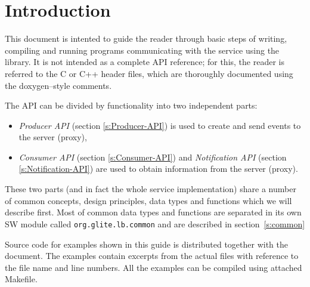 %
%

\section{Introduction}

This document is intented to guide the reader through basic steps
of writing, compiling and running programs communicating with the \LB
service using the \LB library. It is not intended as a complete API
reference; for this, the reader is referred to the C or C++ header
files, which are thoroughly documented using the doxygen--style
comments.

The \LB API can be divided by functionality into two independent
parts:
\begin{itemize}
\item \textit{\LB Producer API} (section \ref{s:Producer-API}) is used
to create and send events to the \LB server (proxy),
\item \textit{\LB Consumer API} (section \ref{s:Consumer-API}) and \textit{\LB
Notification API} (section \ref{s:Notification-API}) are used to obtain
information from the  \LB server (proxy).
\end{itemize}
These two parts (and in fact the whole \LB service implementation)
share a number of common concepts, design principles, data types and
functions which we will describe first. Most of common data types and
functions are separated in its own SW module called
\verb'org.glite.lb.common' and are described in section~\ref{s:common}

%
Source code for examples shown in this guide is distributed together
with the document. The examples contain excerpts from the actual files
with reference to the file name and line numbers. All the examples can
be compiled using attached Makefile.

